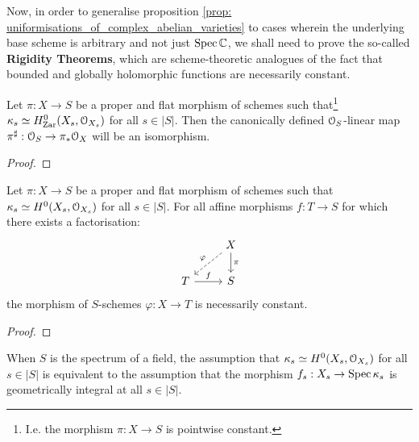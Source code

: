             Now, in order to generalise proposition \ref{prop: uniformisations_of_complex_abelian_varieties} to cases wherein the underlying base scheme is arbitrary and not just $\operatorname{Spec} \mathbb{C}$, we shall need to prove the so-called \textbf{Rigidity Theorems}, which are scheme-theoretic analogues of the fact that bounded and globally holomorphic functions are necessarily constant.
            \begin{theorem}[Rigidity I] \label{theorem: rigidity_theorem_for_abelian_varieties_1}
                Let $\pi: X \to S$ be a proper and flat morphism of schemes such that\footnote{I.e. the morphism $\pi: X \to S$ is pointwise constant.} $\kappa_s \simeq H^0_{\mathrm{Zar}}(X_s, \mathcal{O}_{X_s})$ for all $s \in |S|$. Then the canonically defined $\mathcal{O}_S$-linear map $\pi^{\sharp}: \mathcal{O}_S \to \pi_*\mathcal{O}_X$ will be an isomorphism.
            \end{theorem}
                \begin{proof}
                    
                \end{proof}
            \begin{corollary} \label{coro: liouville_theorem_on_entire_functions_for_schemes}
                Let $\pi: X \to S$ be a proper and flat morphism of schemes such that $\kappa_s \simeq H^0(X_s, \mathcal{O}_{X_s})$ for all $s \in |S|$. For all affine morphisms $f: T \to S$ for which there exists a factorisation:
                    $$
                        \begin{tikzcd}
                        	& X \\
                        	T & S
                        	\arrow["\pi", from=1-2, to=2-2]
                        	\arrow["f", from=2-1, to=2-2]
                        	\arrow["\varphi"', dashed, from=1-2, to=2-1]
                        \end{tikzcd}
                    $$
                the morphism of $S$-schemes $\varphi: X \to T$ is necessarily constant.
            \end{corollary}
                \begin{proof}
                    
                \end{proof}
            \begin{remark}
                When $S$ is the spectrum of a field, the assumption that $\kappa_s \simeq H^0(X_s, \mathcal{O}_{X_s})$ for all $s \in |S|$ is equivalent to the assumption that the morphism $f_s: X_s \to \operatorname{Spec} \kappa_s$ is geometrically integral at all $s \in |S|$.
            \end{remark}
